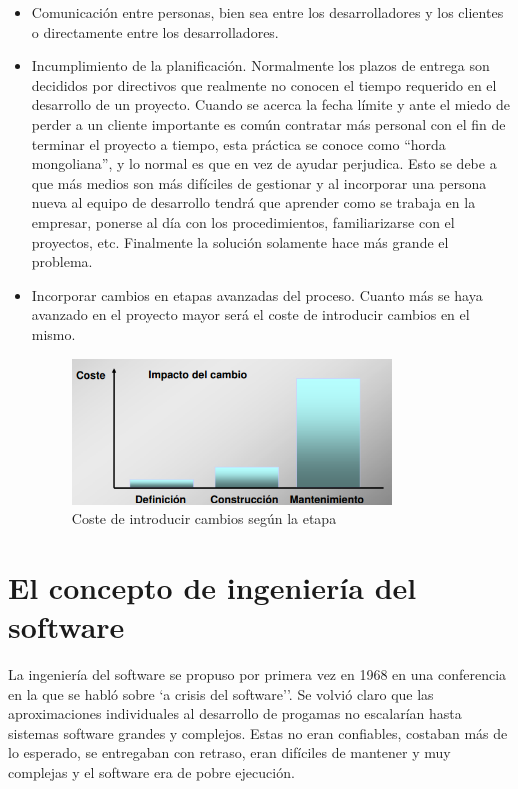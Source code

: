\documentclass{article}
\begin{document}
\begin{itemize}
\item Comunicación entre personas, bien sea entre los desarrolladores y los clientes o directamente entre los desarrolladores.

\item Incumplimiento de la planificación. Normalmente los plazos de entrega son decididos por directivos que realmente no conocen el tiempo requerido en el desarrollo de un proyecto. Cuando se acerca la fecha límite y ante el miedo de perder a un cliente importante es común contratar más personal con el fin de terminar el proyecto a tiempo, esta práctica se conoce como ``horda mongoliana'', y lo normal es que en vez de ayudar perjudica. Esto se debe a que más medios son más difíciles de gestionar y al incorporar una persona nueva al equipo de desarrollo tendrá que aprender como se trabaja en la empresar, ponerse al día con los procedimientos, familiarizarse con el proyectos, etc. Finalmente la solución solamente hace más grande el problema.

\item Incorporar cambios en etapas avanzadas del proceso. Cuanto más se haya avanzado en el proyecto mayor será el coste de introducir cambios en el mismo.

\begin{figure}[h]
\centering
\caption{Coste de introducir cambios según la etapa}
\includegraphics[scale=1,width=0.8\textwidth]{introducir_cambios.png}
\end{figure}
\end{itemize}

\section{El concepto de ingeniería del software}
La ingeniería del software se propuso por primera vez en 1968 en una conferencia en la que se habló sobre `a crisis del software''. Se volvió claro que las aproximaciones individuales al desarrollo de progamas no escalarían hasta sistemas software grandes y complejos. Estas no eran confiables, costaban más de lo esperado, se entregaban con retraso, eran difíciles de mantener y muy complejas y el software era de pobre ejecución. \\
\end{document}
